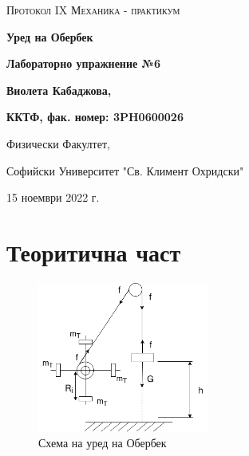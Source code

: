 \documentclass[12pt]{article}
\begin{document}
\begin{titlepage}
	\flushleft
	{\scshape\Large Протокол IX \hspace{2cm} Механика - практикум\par}
	\vspace{5cm}
	{\huge\bfseries Уред на Обербек\par}
	\vspace{1cm}
	{\LARGE\bfseries Лабораторно упражнение №6\par}
	\vspace{5cm}
    {\LARGE\bfseries Виолета Кабаджова, \par}
    {\large\bfseries ККТФ, фак. номер: 3PH0600026\par}
	\vspace{1cm}
	
	{\large Физически Факултет, 
	
	Софийски Университет "Св. Климент Охридски"
	
	15 ноември 2022 г.\par}
	
\end{titlepage}

\section{Теоритична част}\label{sec:theoretical-part}
\begin{figure}
    \centering
    \includegraphics[width=0.5\textwidth]{images/oberbeck.drawio.png}
    \caption{Схема на уред на Обербек}
    \label{fig:setup}
\end{figure}
\end{document}
